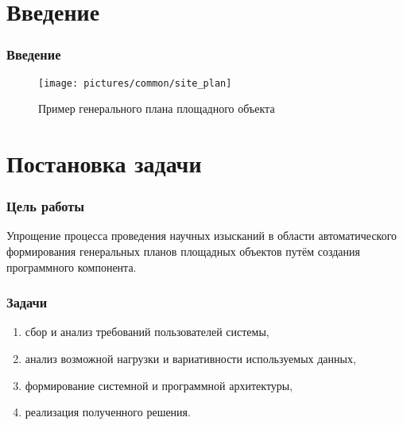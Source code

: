 \section{Введение}

\begin{frame}
\frametitle{Введение}
\begin{figure}
    \texttt{[image: pictures/common/site\_plan]}
    \caption{Пример генерального плана площадного объекта}
\end{figure}
\end{frame}



\section{Постановка задачи}

\begin{frame}
\frametitle{Цель работы}
Упрощение процесса проведения научных изысканий
в области автоматического формирования генеральных планов площадных объектов
путём создания программного компонента.
\end{frame}


\begin{frame}
\frametitle{Задачи}
\begin{enumerate}
    \item сбор и анализ требований пользователей системы,
    \item анализ возможной нагрузки и вариативности используемых данных,
    \item формирование системной и программной архитектуры,
    \item реализация полученного решения.
\end{enumerate}
\end{frame}
